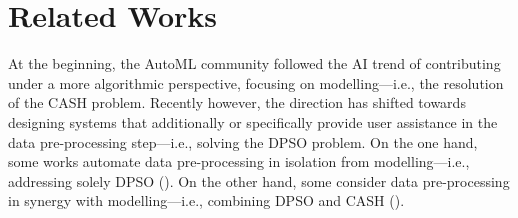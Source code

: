 

\section{Related Works}
\label{effective-sec:related-work}
At the beginning, the AutoML community followed the AI trend of contributing under a more algorithmic perspective, focusing on modelling---i.e., the resolution of the CASH problem.
Recently however, the direction has shifted towards designing systems that additionally or specifically provide user assistance in the data pre-processing step---i.e., solving the DPSO problem.
On the one hand, some works automate data pre-processing in isolation from modelling---i.e., addressing solely DPSO ().
On the other hand, some consider data pre-processing in synergy with modelling---i.e., combining DPSO and CASH ().

